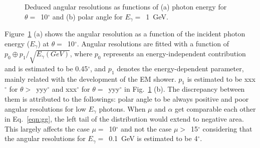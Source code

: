 \documentclass[preprint,12pt,times,a4paper]{elsarticle}
\begin{document}
\begin{figure}[!hbt]
\centering
{}
\caption{ Deduced angular resolutions as functions of (a) photon energy for $\theta=$~10$^{\circ}$ and (b) polar angle for $E_{\gamma}=$~1~GeV. }
\label{fig:angle_reco_dep_gr}
\end{figure}

Figure~\ref{fig:angle_reco_dep_gr} (a) shows the angular resolution as a function of the incident photon energy ($E_{\gamma}$) at $\theta=$~10$^{\circ}$. Angular resolutions are fitted with a function of $p_{0} \oplus p_{1}/\sqrt{E_{\gamma}(GeV)}$, where $p_{0}$ represents an energy-independent contribution and is estimated to be 0.45$^{\circ}$, and $p_{1}$ denotes the energy-dependent parameter, mainly related with the development of the EM shower. $p_{1}$ is estimated to be xxx$^{\circ}$ for $\theta>$~yyy$^{\circ}$ and xxx$^{\circ}$ for $\theta=$~yyy$^{\circ}$ in Fig.~\ref{fig:angle_reco_dep_gr} (b). The discrepancy between them is attributed to the followings: polar angle to be always positive and poor angular resolutions for low $E_{\gamma}$ photons. When $\mu$ and $\alpha$ get comparable each other in Eq.~\ref{eqn:gg}, the left tail of the distribution would extend to negative area. This largely affects the case $\mu=$~10$^{\circ}$ and not the case $\mu>$~15$^{\circ}$ considering that the angular resolutions for $E_{\gamma}=$~0.1~GeV is estimated to be 4$^{\circ}$. 
\end{document}
